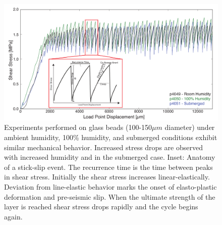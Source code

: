 \begin{figure}
\includegraphics[width=40pc]{chap_electrical/ss_humidity.pdf}
\caption{Experiments performed on glass beads (100-150$\mu m$ diameter) under ambient humidity, 100\% humidity, and submerged conditions exhibit similar mechanical behavior.  Increased stress drops are observed with increased humidity and in the submerged case.  Inset: Anatomy of a stick-slip event.  The recurrence time is the time between peaks in shear stress.  Initially the shear stress increases linear-elastically.  Deviation from line-elastic behavior marks the onset of elasto-plastic deformation and pre-seismic slip.  When the ultimate strength of the layer is reached shear stress drops rapidly and the cycle begins again.}
\label{ss_humidity}
\end{figure}

